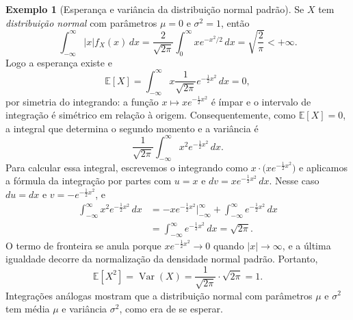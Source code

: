 \documentclass[12pt,portuguese]{article}
\theoremstyle{definition}
\newtheorem{example}[example]{Exemplo}
\theoremstyle{plainexercise}
\theoremstyle{starredexercise}
\theoremstyle{definition}
\begin{document}
\begin{example}[Esperança e variância da distribuição normal padrão]\label{ex:esperanca-normal}
  Se $X$ tem \emph{distribuição normal} com parâmetros $\mu = 0$ e
  $\sigma^2 = 1$, então
  \[
    \int_{-\infty}^{\infty}|x|f_X(x)\,dx
    =\frac{2}{\sqrt{2\pi}}\int_0^\infty x e^{-x^2/2}\,dx
    =\sqrt{\frac{2}{\pi}}<+\infty.
  \]
  Logo a esperança existe e
  \[
    \mathbb{E}[X] = \int_{-\infty}^{\infty} x \frac{1}{\sqrt{2\pi}}
    e^{-\frac{1}{2}x^2}\,dx = 0,
  \]
  por simetria do integrando: a função $x \mapsto x e^{-\frac{1}{2}x^2}$
  é ímpar e o intervalo de integração é simétrico em relação à origem.
  Consequentemente, como $\mathbb{E}[X] = 0$, a integral que determina
  o segundo momento e a variância é
  \[
    \frac{1}{\sqrt{2\pi}} \int_{-\infty}^{\infty} x^2
    e^{-\frac{1}{2}x^2}\,dx.
  \]
  Para calcular essa integral, escrevemos o integrando como
  $x \cdot \bigl(x e^{-\frac{1}{2}x^2}\bigr)$ e aplicamos a fórmula da
  integração por partes com $u = x$ e
  $dv = x e^{-\frac{1}{2}x^2}\,dx$. Nesse caso $du = dx$ e
  $v = -e^{-\frac{1}{2}x^2}$, e
  \[
    \begin{aligned}
      \int_{-\infty}^{\infty} x^2 e^{-\frac{1}{2}x^2}\,dx
      &= -x e^{-\frac{1}{2}x^2}\Bigr|_{-\infty}^{\infty}
        + \int_{-\infty}^{\infty} e^{-\frac{1}{2}x^2}\,dx 
      \\[0.3cm]
      &= \int_{-\infty}^{\infty} e^{-\frac{1}{2}x^2}\,dx
        = \sqrt{2\pi}.
    \end{aligned}
  \]
  O termo de fronteira se anula porque
  $x e^{-\frac{1}{2}x^2} \to 0$ quando $|x| \to \infty$, e a última
  igualdade decorre da normalização da densidade normal padrão. Portanto,
  \[
  \mathbb{E}[X^2]=\operatorname{Var}(X)
  = \frac{1}{\sqrt{2\pi}} \cdot \sqrt{2\pi} = 1.
  \]
  Integrações análogas mostram que a distribuição normal com parâmetros
  $\mu$ e $\sigma^2$ tem média $\mu$ e variância $\sigma^2$, como
  era de se esperar.
\end{example}
\end{document}
